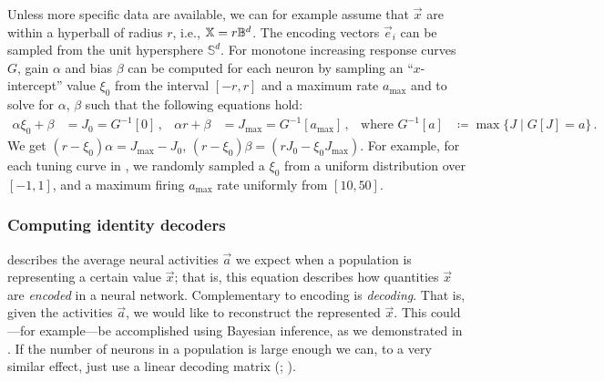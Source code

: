Unless more specific data are available, we can for example assume that $\vec x$ are within a hyperball of radius $r$, i.e., $\mathbb{X} = r \mathbb{B}^d$.
The encoding vectors $\vec e_i$ can be sampled from the unit hypersphere $\mathbb{S}^d$.
For monotone increasing response curves $G$, gain $\alpha$ and bias $\beta$ can be computed for each neuron by sampling an \enquote{$x$-intercept} value $\xi_0$ from the interval $[-r, r]$ and a maximum rate $a_\mathrm{max}$ and to solve for $\alpha$, $\beta$ such that the following equations hold:
\begin{align*}
	\alpha \xi_0 + \beta &= J_0 = G^{-1}[0] \,, &
	\alpha r + \beta &= J_\mathrm{max} = G^{-1}[a_\mathrm{max}] \,, & \text{where } G^{-1}[a] &\coloneqq \max \big\{ J \mid G[J] = a \big\} \,.
\end{align*}
We get $(r - \xi_0) \alpha = J_\mathrm{max} - J_0$, $(r - \xi_0) \beta = (r J_0 - \xi_0 J_\mathrm{max})$.
For example, for each tuning curve in , we randomly sampled a $\xi_0$ from a uniform distribution over $[-1, 1]$, and a maximum firing $a_\mathrm{max}$ rate uniformly from $[10, 50]$.

\subsubsection{Computing identity decoders}
 describes the average neural activities $\vec a$ we expect when a population is representing a certain value $\vec x$; that is, this equation describes how quantities $\vec x$ are \emph{encoded} in a neural network.
Complementary to encoding is \emph{decoding}.
That is, given the activities $\vec a$, we would like to reconstruct the represented $\vec x$.
This could---for example---be accomplished using Bayesian inference, as we demonstrated in .
If the number of neurons \Npop in a population is large enough we can, to a very similar effect, just use a linear decoding matrix \Dec (; \cite{salinas1994vector}).

